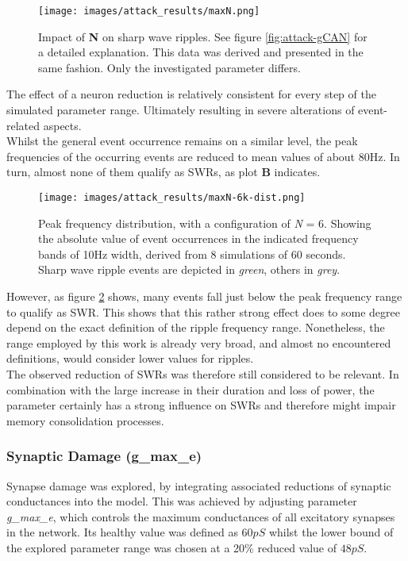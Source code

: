         \begin{figure}[htbp]
            \centering
            \texttt{[image: images/attack\_results/maxN.png]}
            \caption{Impact of \textbf{N} on sharp wave ripples. See figure \ref{fig:attack-gCAN} for a detailed explanation. This data was derived and presented in the same fashion. Only the investigated parameter differs.}
            \label{fig:attack-neuron}
        \end{figure}
        The effect of a neuron reduction is relatively consistent for every step of the simulated parameter range. Ultimately resulting in severe alterations of event-related aspects.\\
        Whilst the general event occurrence remains on a similar level, the peak frequencies of the occurring events are reduced to mean values of about 80Hz. In turn, almost none of them qualify as SWRs, as plot \textbf{B} indicates.
        \begin{figure}[htbp]
            \centering
            \texttt{[image: images/attack\_results/maxN-6k-dist.png]}
            \caption{Peak frequency distribution, with a configuration of \textit{N} = 6. Showing the absolute value of event occurrences in the indicated frequency bands of 10Hz width, derived from 8 simulations of 60 seconds. Sharp wave ripple events are depicted in \textit{green}, others in \textit{grey}.}
            \label{fig:attack-neuron-6k}
        \end{figure}
        However, as figure \ref{fig:attack-neuron-6k} shows, many events fall just below the peak frequency range to qualify as SWR. This shows that this rather strong effect does to some degree depend on the exact definition of the ripple frequency range. Nonetheless, the range employed by this work is already very broad, and almost no encountered definitions, would consider lower values for ripples.\\ 
        The observed reduction of SWRs was therefore still considered to be relevant. In combination with the large increase in their duration and loss of power, the parameter certainly has a strong influence on SWRs and therefore might impair memory consolidation processes. 
        
        
        \subsubsection{Synaptic Damage (g\_max\_e)}
        Synapse damage was explored, by integrating associated reductions of synaptic conductances into the model. This was achieved by adjusting parameter \textit{g\_max\_e}, which controls the maximum conductances of all excitatory synapses in the network. Its healthy value was defined as \(60pS\) whilst the lower bound of the explored parameter range was chosen at a 20\% reduced value of \(48pS\).
        

